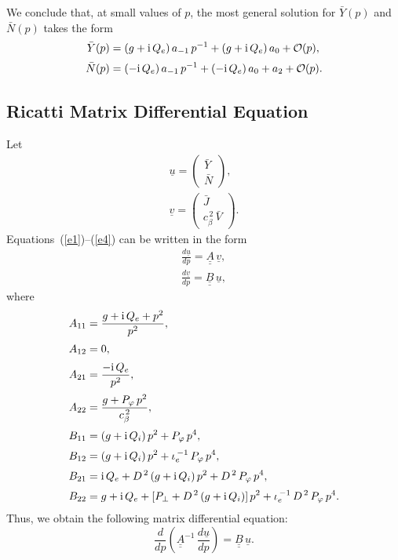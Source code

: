 \documentclass[12pt,prb,aps]{revtex4-1}
\begin{document}
We conclude that, at small values of $p$, the most general solution for $\bar{Y}(p)$ and $\bar{N}(p)$ takes the form 
\begin{align}\label{yy}
\bar{Y}(p) &= (g+{\rm i}\,Q_e)\,a_{-1} \,p^{-1}+(g+{\rm i}\,Q_e) \,a_0+ {\cal O}(p),\\[0.5ex]
\bar{N}(p) &= (-{\rm i}\,Q_e)\,a_{-1}\,p^{-1} + (-{\rm i}\,Q_e)\,a_0 + a_2 + {\cal O}(p).\label{nn}
\end{align}

\subsection{Ricatti Matrix Differential Equation}
Let
\begin{align}
\underline{u}= \left(\begin{array}{c}\bar{Y}\\\bar{N}\end{array}\right),\\[0.5ex]
\underline{v}= \left(\begin{array}{c}\bar{J}\\c_\beta^{\,2}\,\bar{V}\end{array}\right).
\end{align}
Equations~(\ref{e1})--(\ref{e4}) can be written in the form 
\begin{align}
\frac{d\underline{u}}{dp}= \underline{\underline{A}}\,\underline{v},\\[0.5ex]
\frac{d\underline{v}}{dp}= \underline{\underline{B}}\,\underline{u},
\end{align}
where
\begin{align}
A_{11} &=  \frac{g+{\rm i}\,Q_e+p^2}{p^2},\\[0.5ex]
A_{12}&=0,\\[0.5ex]
A_{21} &= \frac{-{\rm i}\,Q_e}{p^2},\\[0.5ex]
A_{22} &= \frac{g + P_\varphi\,p^2}{c_\beta^{\,2}},\\[0.5ex]
B_{11} &= (g+{\rm i}\,Q_i)\,p^2 + P_\varphi\,p^4,\\[0.5ex]
B_{12} &= (g+{\rm i}\,Q_i)\,p^2 + \iota_e^{\,-1}\,P_\varphi\,p^4,\\[0.5ex]
B_{21}&= {\rm i}\,Q_e+ D^{\,2}\,(g+{\rm i}\,Q_i)\,p^2 + D^{\,2}\,P_\varphi\,p^4,\\[0.5ex]
B_{22} & =g+{\rm i}\,Q_e + [P_\perp + D^{\,2}\,(g + {\rm i}\,Q_i)]\,p^2 + \iota_e^{\,-1}\,D^{\,2}\,P_\varphi\,p^4.
\end{align}
Thus, we obtain the following matrix differential equation: 
\begin{equation}\label{mat}
\frac{d}{dp}\!\left(\underline{\underline{A}}^{-1}\,\frac{d\underline{u}}{dp}\right) = \underline{\underline{B}}\,\underline{u}.
\end{equation}
\end{document}
